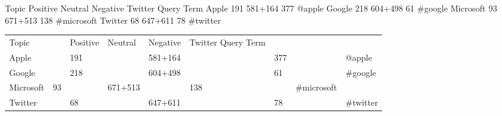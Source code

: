 
Topic		Positive	Neutral	Negative	Twitter Query Term
Apple		191		581+164		377		@apple
Google		218		604+498		61		#google
Microsoft	93		671+513		138		#microsoft
Twitter		68		647+611		78		#twitter

\begin{tabular}{lllllllll}

Topic &  & Positive & Neutral & Negative & Twitter Query Term \\
Apple &  & 191 &  & 581+164 &  & 377 &  & @apple \\
Google &  & 218 &  & 604+498 &  & 61 &  & \#google \\
Microsoft & 93 &  & 671+513 &  & 138 &  & \#microsoft \\
Twitter &  & 68 &  & 647+611 &  & 78 &  & \#twitter \\

\end{tabular}
